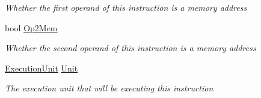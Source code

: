 \begin{DoxyCompactItemize}
\begin{DoxyCompactList}\small\item\em Whether the first operand of this instruction is a memory address \end{DoxyCompactList}\item 
bool \hyperlink{class_c_p_u___o_s___simulator_1_1_c_p_u_1_1_instruction_ace33aaf155d1f6a727337811538665b6}{Op2\+Mem}
\begin{DoxyCompactList}\small\item\em Whether the second operand of this instruction is a memory address \end{DoxyCompactList}\item 
\hyperlink{class_c_p_u___o_s___simulator_1_1_c_p_u_1_1_execution_unit}{Execution\+Unit} \hyperlink{class_c_p_u___o_s___simulator_1_1_c_p_u_1_1_instruction_a75e93b5a62558ece7da698068625bd8f}{Unit}
\begin{DoxyCompactList}\small\item\em The execution unit that will be executing this instruction \end{DoxyCompactList}\end{DoxyCompactItemize}
